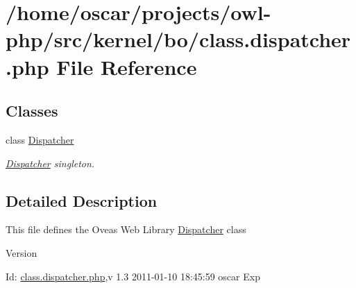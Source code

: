 \section{/home/oscar/projects/owl-\/php/src/kernel/bo/class.dispatcher.php File Reference}
\label{class_8dispatcher_8php}
\subsection*{Classes}
\begin{DoxyCompactItemize}
\item 
class \hyperlink{classDispatcher}{Dispatcher}
\begin{DoxyCompactList}\small\item\em \hyperlink{classDispatcher}{Dispatcher} singleton. \item\end{DoxyCompactList}\end{DoxyCompactItemize}


\subsection{Detailed Description}
This file defines the Oveas Web Library \hyperlink{classDispatcher}{Dispatcher} class \begin{DoxyVersion}{Version}

\end{DoxyVersion}
\begin{DoxyParagraph}{Id:}
\hyperlink{class_8dispatcher_8php}{class.dispatcher.php},v 1.3 2011-\/01-\/10 18:45:59 oscar Exp 
\end{DoxyParagraph}
